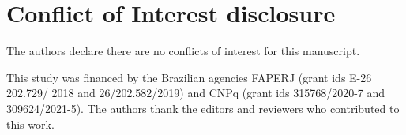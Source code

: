 \documentclass[draft]{agujournal2019}
\begin{document}

\section*{Conflict of Interest disclosure}
The authors declare there are no conflicts of interest for this manuscript.


\acknowledgments
This study was financed by the Brazilian agencies FAPERJ (grant ids E-26 202.729/
2018 and 26/202.582/2019) and CNPq (grant ids 315768/2020-7 and 309624/2021-5). 
The authors thank the editors and reviewers who contributed to this work.
\end{document}
